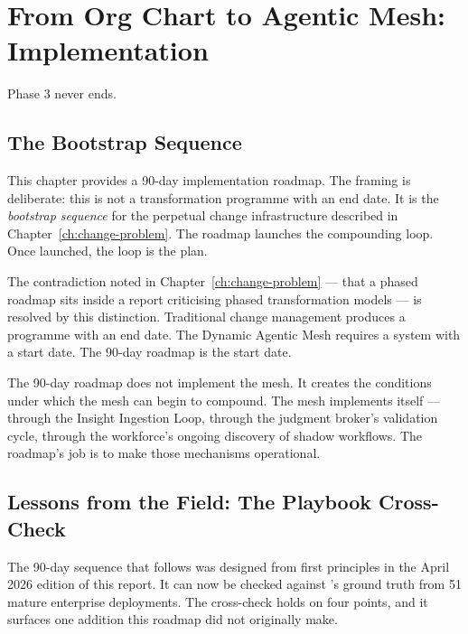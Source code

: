 \chapter{From Org Chart to Agentic Mesh: Implementation}
\label{ch:implementation}

\epigraph{Phase 3 never ends.}{}

\section{The Bootstrap Sequence}

This chapter provides a 90-day implementation roadmap. The framing is deliberate: this is not a transformation programme with an end date. It is the \emph{bootstrap sequence} for the perpetual change infrastructure described in Chapter~\ref{ch:change-problem}. The roadmap launches the compounding loop. Once launched, the loop is the plan.

The contradiction noted in Chapter~\ref{ch:change-problem} --- that a phased roadmap sits inside a report criticising phased transformation models --- is resolved by this distinction. Traditional change management produces a programme with an end date. The Dynamic Agentic Mesh requires a system with a start date. The 90-day roadmap is the start date.

\begin{keyinsight}
The 90-day roadmap does not implement the mesh. It creates the conditions under which the mesh can begin to compound. The mesh implements itself --- through the Insight Ingestion Loop, through the judgment broker's validation cycle, through the workforce's ongoing discovery of shadow workflows. The roadmap's job is to make those mechanisms operational.
\end{keyinsight}

\section{Lessons from the Field: The Playbook Cross-Check}

The 90-day sequence that follows was designed from first principles in the April 2026 edition of this report. It can now be checked against \textcite{Pereira2026Playbook}'s ground truth from 51 mature enterprise deployments. The cross-check holds on four points, and it surfaces one addition this roadmap did not originally make.

